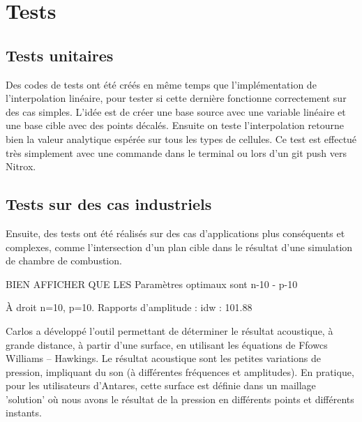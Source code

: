 

\section{Tests}
\subsection{Tests unitaires}
Des codes de tests ont été créés en même temps que l'implémentation de l'interpolation linéaire, pour tester si cette dernière fonctionne correctement sur des cas simples.
L'idée est de créer une base source avec une variable linéaire et une base cible avec des points décalés. Ensuite on teste l'interpolation retourne bien la valeur analytique espérée sur tous les types de cellules. Ce test est effectué très simplement avec une commande dans le terminal ou lors d'un git push vers Nitrox.


\subsection{Tests sur des cas industriels}

Ensuite, des tests ont été réalisés sur des cas d'applications plus conséquents et complexes, comme l'intersection d'un plan cible dans le résultat d'une simulation de chambre de combustion. 




BIEN AFFICHER QUE LES Paramètres optimaux sont n-10 - p-10

À droit n=10, p=10. Rapports d'amplitude : idw : 101.88 %

Carlos a développé l'outil permettant de déterminer le résultat acoustique, à grande distance, à partir d'une surface, en utilisant les équations de Ffowcs Williams – Hawkings. Le résultat acoustique sont les petites variations de pression, impliquant du son (à différentes fréquences et amplitudes). En pratique, pour les utilisateurs d'Antares, cette surface est définie dans un maillage 'solution' où nous avons le résultat de la pression en différents points et différents instants.

